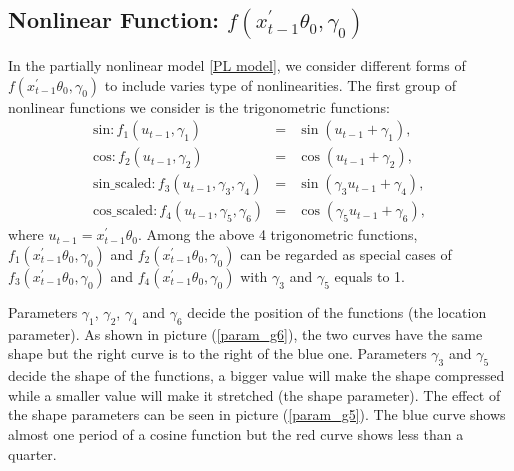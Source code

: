 \documentclass[a4paper,12pt,times,numbered,print,index]{report}
\numberwithin{equation}{section}
\begin{document}
	
\subsection{Nonlinear Function: $f\left(x_{t-1}^{\prime }\theta _{0},\gamma _{0}\right)$}
	In the partially nonlinear model \ref{PL model}, we consider different forms of $f\left(x_{t-1}^{\prime }\theta _{0},\gamma _{0}\right)$ to include varies type of nonlinearities. The first group of nonlinear functions we consider is the trigonometric functions: 
	\begin{eqnarray*}
		\text{sin}: f_{1}\left( u_{t-1},\gamma _{1}\right) &=&\sin \left( u_{t-1}+\gamma_{1}\right),  \\
		\text{cos}: f_{2}\left( u_{t-1},\gamma _{2}\right) &=&\cos \left( u_{t-1}+\gamma_{2}\right), \\
		\text{sin\_scaled}: f_{3}\left( u_{t-1},\gamma_{3}, \gamma_{4}\right) &=&\sin \left( \gamma_{3}u_{t-1}+\gamma_{4}\right),  \\
		\text{cos\_scaled}: f_{4}\left( u_{t-1},\gamma_{5}, \gamma_{6}\right) &=&\cos \left( \gamma_{5}u_{t-1}+\gamma_{6}\right),
	\end{eqnarray*} 
	where $u_{t-1} =  x_{t-1}^{\prime }\theta _{0}$.
	Among the above 4 trigonometric functions, $f_{1} \left(x_{t-1}^{\prime }\theta _{0},\gamma _{0}\right)$ and $f_{2} \left(x_{t-1}^{\prime }\theta _{0},\gamma _{0}\right)$ can be regarded as special cases of $f_{3}\left(x_{t-1}^{\prime }\theta _{0},\gamma _{0}\right)$ and $f_{4} \left(x_{t-1}^{\prime }\theta _{0},\gamma _{0}\right)$ with $\gamma_{3}$ and $\gamma_{5}$ equals to 1. 
	
	Parameters $\gamma_{1}$, $\gamma_{2}$, $\gamma_{4}$ and $\gamma_{6}$ decide the position of the functions (the location parameter). As shown in picture (\ref{param_g6}), the two curves have the same shape but the right curve is to the right of the blue one. Parameters $\gamma_{3}$ and $\gamma_{5}$ decide the shape of the functions, a bigger value will make the shape compressed while a smaller value will make it stretched (the shape parameter). The effect of the shape parameters can be seen in picture (\ref{param_g5}). The blue curve shows almost one period of a cosine function but the red curve shows less than a quarter.
	
\end{document}
